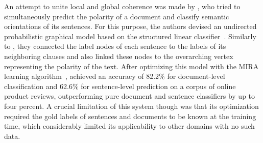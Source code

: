 


An attempt to unite local and global coherence was made by
, who tried to simultaneously predict the polarity
of a document and classify semantic orientations of its sentences.
For this purpose, the authors devised an undirected probabilistic
graphical model based on the structured linear
classifier~\cite{Collins:02}.  Similarly to , they
connected the label nodes of each sentence to the labels of its
neighboring clauses and also linked these nodes to the overarching
vertex representing the polarity of the text.  After optimizing this
model with the MIRA learning algorithm~\cite{Crammer:03},
 achieved an accuracy of 82.2\% for
document-level classification and 62.6\% for sentence-level prediction
on a corpus of online product reviews, outperforming pure document and
sentence classifiers by up to four percent.  A crucial limitation of
this system though was that its optimization required the gold labels
of sentences and documents to be known at the training time, which
considerably limited its applicability to other domains with no such
data.


